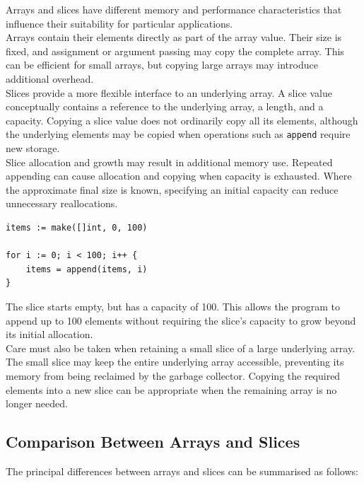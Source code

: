 Arrays and slices have different memory and performance characteristics that influence their suitability for particular applications.\\

Arrays contain their elements directly as part of the array value. Their size is fixed, and assignment or argument passing may copy the complete array. This can be efficient for small arrays, but copying large arrays may introduce additional overhead.\\

Slices provide a more flexible interface to an underlying array. A slice value conceptually contains a reference to the underlying array, a length, and a capacity. Copying a slice value does not ordinarily copy all its elements, although the underlying elements may be copied when operations such as \texttt{append} require new storage.\\

Slice allocation and growth may result in additional memory use. Repeated appending can cause allocation and copying when capacity is exhausted. Where the approximate final size is known, specifying an initial capacity can reduce unnecessary reallocations.

\begin{lstlisting}
items := make([]int, 0, 100)

for i := 0; i < 100; i++ {
    items = append(items, i)
}
\end{lstlisting}

The slice starts empty, but has a capacity of 100. This allows the program to append up to 100 elements without requiring the slice's capacity to grow beyond its initial allocation.\\

Care must also be taken when retaining a small slice of a large underlying array. The small slice may keep the entire underlying array accessible, preventing its memory from being reclaimed by the garbage collector. Copying the required elements into a new slice can be appropriate when the remaining array is no longer needed.

\subsection{Comparison Between Arrays and Slices}

The principal differences between arrays and slices can be summarised as follows:

